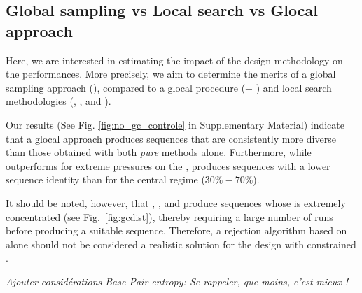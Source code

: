 

\subsection{Global sampling vs Local search vs Glocal approach}


Here, we are interested in estimating the impact of the design methodology on the performances. More precisely, we aim to determine the merits of a global sampling approach (\ourprog), compared to a glocal procedure (\ourprog + \RNAinverse) and local search methodologies (\RNAinverse, \INFORNA, \NUPACK and \frankenstein). 

Our results (See Fig. \ref{fig:no_gc_controle} in Supplementary Material) indicate that a glocal approach produces sequences that are consistently more diverse than those obtained with both {\em pure} methods alone. Furthermore, while \ourprog outperforms \RNAinverse for extreme pressures on the \GCContent, \RNAinverse produces sequences with a lower sequence identity than \ourprog for the central \GCContent regime ($30\%-70\%$). 

It should be noted, however, that \RNAinverse, \INFORNA, \NUPACK  and \frankenstein produce sequences whose \GCContent is extremely concentrated (see Fig.~\ref{fig:gcdist}), thereby requiring a large number of runs before producing a suitable \GCContent sequence. Therefore, a rejection algorithm based on \RNAinverse alone should not be considered a realistic solution for the design with constrained \GCContent. 

{\em Ajouter considérations Base Pair entropy: Se rappeler, que moins, c'est mieux !}











